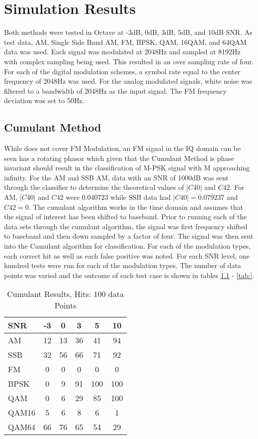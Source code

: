 \chapter{Simulation Results}

Both methods were tested in Octave at -3dB, 0dB, 3dB, 5dB, and 10dB SNR.  As
test data, AM, Single Side Band AM, FM, BPSK, QAM, 16QAM, and 64QAM data was
used.  Each signal was modulated at 2048Hz and sampled at 8192Hz with complex
sampling being used.  This resulted in an over sampling rate of four.  For each
of the digital modulation schemes, a symbol rate equal to the center frequency
of 2048Hz was used.  For the analog modulated signals, white noise was filtered
to a bandwidth of 2048Hz as the input signal.  The FM frequency deviation was
set to 50Hz.

\section{Cumulant Method}

While \cite{swami2000} does not cover FM Modulation, an FM signal in the IQ
domain can be seen has a rotating phasor which given that the Cumulant Method is
phase invariant should result in the classification of M-PSK signal with M
approaching infinity.  
For the AM and SSB AM, data with an SNR of 1000dB was sent through the
classifier to determine the theoretical values of $|C40|$ and $C42$.  For AM,
$|C40|$ and $C42$ were $0.040723$ while SSB data had $|C40| = 0.079237$ and
$C42 = 0$.
The cumulant algorithm works in the time domain and assumes that the signal of
interest has been shifted to baseband.  Prior to running each of the data sets
through the cumulant algorithm, the signal was first frequency shifted to
baseband and then down sampled by a factor of four.  The signal was then sent
into the Cumulant algorithm for classification.  For each of the modulation
types, each correct hit as well as each false positive was noted.  For each
SNR level, one hundred tests were run for each of the modulation types.  The
number of data points was varied and the outcome of each test case is shown in
tables \ref{tab:cumHit100pt} - \ref{tab:}.

\begin{table}
\caption{Cumulant Results, Hits: 100 data Points}
\centering
\begin{tabular}{ l | c | c | c | c | c } \hline
SNR &	 -3 &	 0 &	 3 &	 5 &	 10\\ \hline \hline 
AM &	 12 &	 13 &	 36 &	 41 &	 94 \\ \hline 
SSB &	 32 &	 56 &	 66 &	 71 &	 92 \\ \hline 
FM &	 0 &	 0 &	 0 &	 0 &	 0 \\ \hline 
BPSK &	 0 &	 9 &	 91 &	 100 &	 100 \\ \hline 
QAM &	 0 &	 6 &	 29 &	 85 &	 100 \\ \hline 
QAM16 &	 5 &	 6 &	 8 &	 6 &	 1 \\ \hline 
QAM64 &	 66 &	 76 &	 65 &	 54 &	 29 \\ \hline
\end{tabular}
\label{tab:cumHit100pt}
\end{table}

